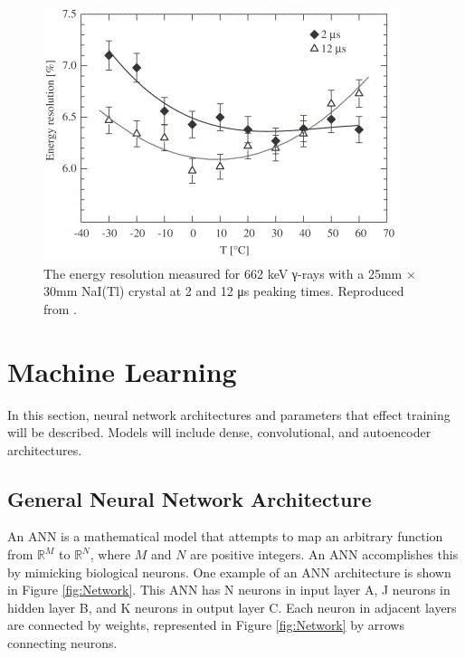 \begin{figure}[H]
\centering
\includegraphics[width=0.95\linewidth]{images/temp-dependence-resolution-moszynski}
\caption{The energy resolution measured for 662 keV γ-rays with a 25mm × 30mm NaI(Tl) crystal at 2 and 12 μs peaking times. Reproduced from \cite{MOSZYNSKI2006739}.}
\label{fig:temp-dependence-resolution-moszynski}
\end{figure}

\section{Machine Learning}

In this section, neural network architectures and parameters that effect training will be described. Models will include dense, convolutional, and autoencoder architectures. 

\subsection{General Neural Network Architecture}

An ANN is a mathematical model that attempts to map an arbitrary function from $\mathbb{R}^M$ to $\mathbb{R}^N$, where $M$ and $N$ are positive integers. An ANN accomplishes this by mimicking biological neurons. One example of an ANN architecture is shown in Figure \ref{fig:Network}. This ANN has N neurons in input layer A, J neurons in hidden layer B, and K neurons in output layer C. Each neuron in adjacent layers are connected by weights, represented in Figure \ref{fig:Network} by arrows connecting neurons. 


